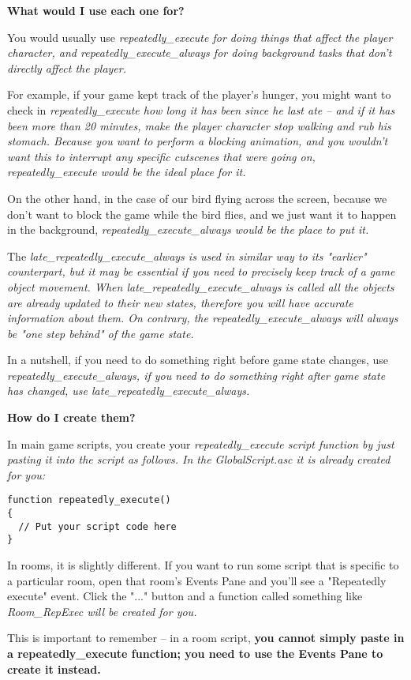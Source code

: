 \bf{What would I use each one for?}

You would usually use \it{repeatedly_execute} for doing things that affect the player character,
and \it{repeatedly_execute_always} for doing background tasks that don't directly affect the
player.

For example, if your game kept track of the player's hunger, you might want to check in
\it{repeatedly_execute} how long it has been since he last ate -- and if it has been more than 20
minutes, make the player character stop walking and rub his stomach. Because you want to perform
a blocking animation, and you wouldn't want this to interrupt any specific cutscenes that were going on,
repeatedly_execute would be the ideal place for it.

On the other hand, in the case of our bird flying across the screen, because we don't want to
block the game while the bird flies, and we just want it to happen in the background,
\it{repeatedly_execute_always} would be the place to put it.

The \it{late_repeatedly_execute_always} is used in similar way to its "earlier" counterpart, but it may be
essential if you need to precisely keep track of a game object movement. When \it{late_repeatedly_execute_always} is
called all the objects are already updated to their new states, therefore you will have accurate information about
them. On contrary, the \it{repeatedly_execute_always} will always be "one step behind" of the game state.

In a nutshell, if you need to do something right before game state changes, use \it{repeatedly_execute_always}, if you
need to do something right after game state has changed, use \it{late_repeatedly_execute_always}.

\bf{How do I create them?}

In main game scripts, you create your \it{repeatedly_execute} script function by just pasting
it into the script as follows. In the GlobalScript.asc it is already created for you:
\begin{verbatim}
function repeatedly_execute()
{
  // Put your script code here
}
\end{verbatim}
In rooms, it is slightly different. If you want to run some script that is specific to a particular
room, open that room's Events Pane and you'll see a "Repeatedly execute" event. Click the "..." button
and a function called something like \it{Room_RepExec} will be created for you.

This is important to remember -- in a room script, \bf{you cannot simply paste in a repeatedly_execute
function}; you need to use the Events Pane to create it instead.

